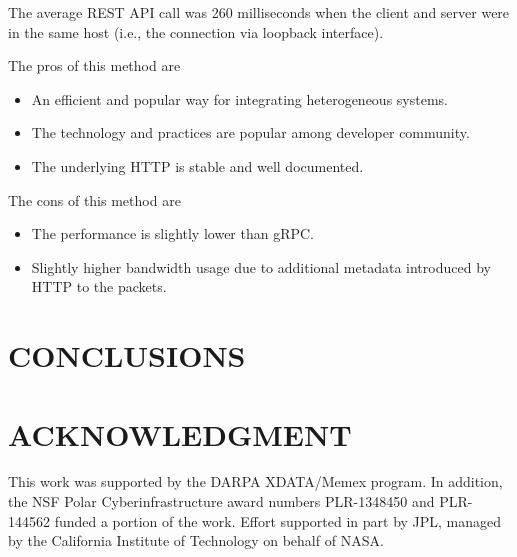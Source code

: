 \documentclass[letterpaper, 10 pt, conference]{ieeeconf}  %
\begin{document}
The average REST API call was 260 milliseconds when the client and server were in the same host (i.e., the connection via loopback interface).

The pros of this method are
\begin{itemize}
\item An efficient and popular way for integrating heterogeneous systems.
\item The technology and practices are popular among developer community.
\item The underlying HTTP is stable and well documented.
\end{itemize}

The cons of this method are
\begin{itemize}
\item The performance is slightly lower than gRPC.
\item Slightly higher bandwidth usage due to additional metadata introduced by HTTP to the packets.
\end{itemize}

\section{CONCLUSIONS}

\section*{ACKNOWLEDGMENT}
This work was supported by the DARPA XDATA/Memex program. In addition, the NSF Polar Cyberinfrastructure award numbers PLR-1348450 and PLR-144562 funded a portion of the work. Effort supported in part by JPL, managed by the California Institute of Technology on behalf of NASA.


\end{document}
